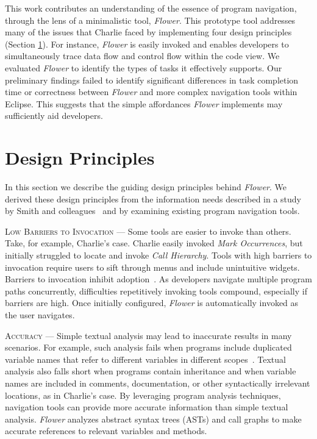\documentclass[conference]{IEEEtran}
\begin{document}
This work contributes an understanding of the essence of program navigation, through the lens of a minimalistic tool, \textit{Flower}.
This prototype tool addresses many of the issues that Charlie faced by implementing four design principles (Section \ref{DesignPrinciples}).
For instance, \textit{Flower} is easily invoked and enables developers to simultaneously trace data flow and control flow within the code view. 
We evaluated \textit{Flower} to identify the types of tasks it effectively supports. 
Our preliminary findings failed to identify significant differences in task completion time or correctness between \textit{Flower} and more complex navigation tools within Eclipse. 
This suggests that the simple affordances \textit{Flower} implements may sufficiently aid developers.


\section{Design Principles}
\label{DesignPrinciples}
In this section we describe the guiding design principles behind \textit{Flower}. We derived these design principles from the information needs described in a study by Smith and colleagues~\cite{Smith2015} and by examining existing program navigation tools.

\vspace{1em} 
\noindent\textsc{Low Barriers to Invocation} ---
Some tools are easier to invoke than others. 
Take, for example, Charlie's case.
Charlie easily invoked \emph{Mark Occurrences}, but initially struggled to locate and invoke \emph{Call Hierarchy}.
Tools with high barriers to invocation require users to sift through menus and include unintuitive widgets. 
Barriers to invocation inhibit adoption~\cite{johnson2013don}.
As developers navigate multiple program paths concurrently, difficulties repetitively invoking tools compound, especially if barriers are high. 
Once initially configured, \textit{Flower} is automatically invoked as the user navigates.

\vspace{1em} 
\noindent\textsc{Accuracy} ---
Simple textual analysis may lead to inaccurate results in many scenarios. For example, such analysis fails when programs include duplicated variable names that refer to different variables in different scopes~\cite{DeLine:2005}. 
Textual analysis also falls short when programs contain inheritance and when variable names are included in comments, documentation, or other syntactically irrelevant locations, as in Charlie's case.
By leveraging program analysis techniques, navigation tools can provide more accurate information than simple textual analysis.
\textit{Flower} analyzes abstract syntax trees (ASTs) and call graphs to make accurate references to relevant variables and methods.
\end{document}
